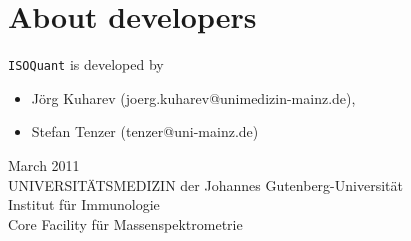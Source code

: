 \documentclass[a4paper,12pt]{scrartcl}
\newcommand{\iq}{\texttt{ISOQuant} }
\begin{document}
%		
%		
\section{About developers}
	\iq is developed by
	\begin{itemize}
		\item J\"org Kuharev (joerg.kuharev@unimedizin-mainz.de),
		\item Stefan Tenzer (tenzer@uni-mainz.de)
	\end{itemize}
	March 2011\\$~$\\
	UNIVERSIT\"ATSMEDIZIN der Johannes Gutenberg-Universit\"at \\
	Institut f\"ur Immunologie \\
	Core Facility f\"ur Massenspektrometrie \\		
\end{document}
